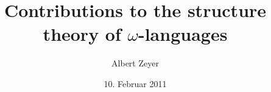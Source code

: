 \documentclass{article}
\begin{document}
\title{Contributions to the structure theory of $\omega$-languages}
\author{Albert Zeyer}
\date{10. Februar 2011}

\maketitle
\tableofcontents






\printindex
\end{document}
